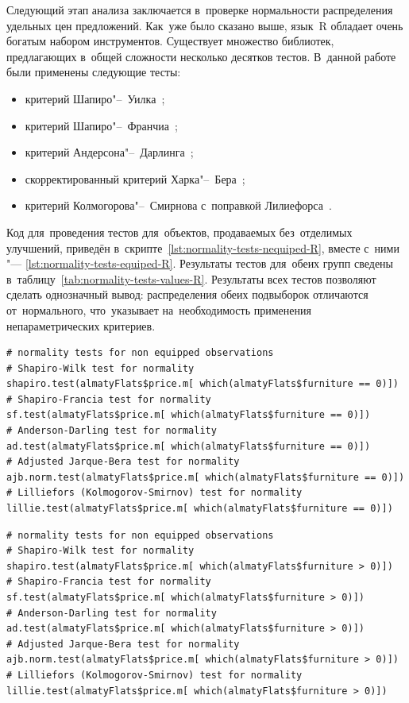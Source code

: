 \documentclass[]{scrreprt}
\begin{document}
Следующий этап анализа заключается в~проверке нормальности распределения удельных цен предложений. Как~уже было сказано выше, язык~R обладает очень богатым набором инструментов. Существует множество библиотек, предлагающих в~общей сложности несколько десятков тестов. В~данной работе были применены следующие тесты:
\begin{itemize}
	\item критерий Шапиро"--~Уилка~\cite{Shapiro-Wilk-test};
	\item критерий Шапиро"--~Франчиа~\cite{Shapiro-Francia-test};
	\item критерий Андерсона"--~Дарлинга~\cite{Anderson-Darling-test};
	\item скорректированный критерий Харка"--~Бера~\cite{Jarque-Bera-test};
	\item критерий Колмогорова"--~Смирнова с~поправкой Лилиефорса~\cite{Liliefors-normality-test}.
\end{itemize}
Код для~проведения тестов для~объектов, продаваемых без~отделимых улучшений, приведён в~скрипте~\ref{lst:normality-tests-nequiped-R}, вместе с~ними "--- \ref{lst:normality-tests-equiped-R}.
Результаты тестов для~обеих групп сведены в~таблицу~\ref{tab:normality-tests-values-R}. Результаты всех тестов позволяют сделать однозначный вывод: распределения обеих подвыборок отличаются от~нормального, что~указывает на~необходимость применения непараметрических критериев.
%
\begin{lstlisting}[float, caption = Проведение тестов на~нормальность для~наблюдений без~отделимых улучшений, firstnumber=1, label= lst:normality-tests-nequiped-R]
# normality tests for non equipped observations
# Shapiro-Wilk test for normality
shapiro.test(almatyFlats$price.m[ which(almatyFlats$furniture == 0)])
# Shapiro-Francia test for normality
sf.test(almatyFlats$price.m[ which(almatyFlats$furniture == 0)])
# Anderson-Darling test for normality
ad.test(almatyFlats$price.m[ which(almatyFlats$furniture == 0)])
# Adjusted Jarque-Bera test for normality
ajb.norm.test(almatyFlats$price.m[ which(almatyFlats$furniture == 0)])
# Lilliefors (Kolmogorov-Smirnov) test for normality
lillie.test(almatyFlats$price.m[ which(almatyFlats$furniture == 0)])
\end{lstlisting}
%
\begin{lstlisting}[float, caption = Проведение тестов на~нормальность для~наблюдений с~отделимыми улучшениями, firstnumber=1, label= lst:normality-tests-equiped-R]
# normality tests for non equipped observations
# Shapiro-Wilk test for normality
shapiro.test(almatyFlats$price.m[ which(almatyFlats$furniture > 0)])
# Shapiro-Francia test for normality
sf.test(almatyFlats$price.m[ which(almatyFlats$furniture > 0)])
# Anderson-Darling test for normality
ad.test(almatyFlats$price.m[ which(almatyFlats$furniture > 0)])
# Adjusted Jarque-Bera test for normality
ajb.norm.test(almatyFlats$price.m[ which(almatyFlats$furniture > 0)])
# Lilliefors (Kolmogorov-Smirnov) test for normality
lillie.test(almatyFlats$price.m[ which(almatyFlats$furniture > 0)])
\end{lstlisting}
%
\end{document}
